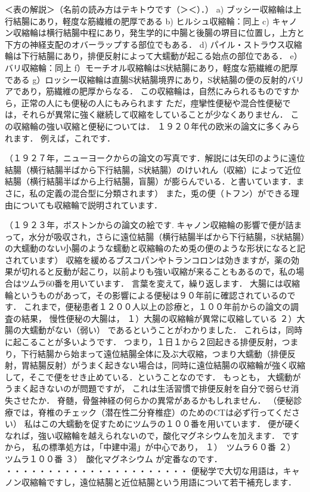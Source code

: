  
＜表の解説＞（名前の読み方はテキトウです（＞＜）．）
a) ブッシー収縮輪は上行結腸にあり，軽度な筋繊維の肥厚である
b) ヒルシュ収縮輪：同上
c) キャノン収縮輪は横行結腸中程にあり，発生学的に中腸と後腸の堺目に位置し，上方と下方の神経支配のオバーラップする部位でもある．
d) パイル・ストラウス収縮輪は下行結腸にあり，排便反射によって大蠕動が起こる始点の部位である．
e）バリ収縮輪：同上
f）モーチオル収縮輪はS状結腸にあり，軽度な筋繊維の肥厚である
g）ロッシー収縮輪は直腸S状結腸境界にあり，S状結腸の便の反射的バリアであり，筋繊維の肥厚からなる．
この収縮輪は，自然にみられるものですから，正常の人にも便秘の人にもみられます
ただ，痙攣性便秘や混合性便秘では，それらが異常に強く継続して収縮をしていることが少なくありません．
この収縮輪の強い収縮と便秘については．
１９２０年代の欧米の論文に多くみられます．
例えば，これです．

（１９２７年，ニューヨークからの論文の写真です．解説には矢印のように遠位結腸（横行結腸半ばから下行結腸，S状結腸）のけいれん（収縮）によって近位結腸（横行結腸半ばから上行結腸，盲腸）が膨らんでいる．と書いています．まさに，私の定義の混合型に分類されます）
また，兎の便（トフン）ができる理由についても収縮輪で説明されています．

（１９２３年，ボストンからの論文の絵です. キャノン収縮輪の影響で便が詰まって，水分が吸収され，さらに遠位結腸（横行結腸半ばから下行結腸，S状結腸）の大蠕動のない小腸のような蠕動と収縮輪のため兎の便のような形状になると記されています）
収縮を緩めるブスコパンやトランコロンは効きますが，薬の効果が切れると反動が起こり，以前よりも強い収縮が来ることもあるので，私の場合はツムラ60番を用いています．
言葉を変えて，繰り返します．
大腸には収縮輪というものがあって，その影響による便秘は９０年前に確認されているのです．
これまで，便秘患者１２００人以上の診療と，１００年前からの論文の調査の結果，
慢性便秘の大腸は，
１）大腸の収縮輪が異常に収縮している
２）大腸の大蠕動がない（弱い）
であるということがわかりました．
これらは，同時に起こることが多いようです．
つまり，１日１から２回起きる排便反射，つまり，下行結腸から始まって遠位結腸全体に及ぶ大収縮，つまり大蠕動（排便反射，胃結腸反射）がうまく起きない場合は，同時に遠位結腸の収縮輪が強く収縮して，そこで便をせき止めている．ということなのです．
もっとも，
大蠕動がうまく起きないのが問題ですが，
これは生活習慣で排便反射を自分で弱らせ消失させたか．
脊髄，骨盤神経の何らかの異常があるかもしれません．
（便秘診療では，脊椎のチェック（潜在性二分脊椎症）のためのCTは必ず行ってください）
私はこの大蠕動を促すためにツムラの１００番を用いています．
便が硬くなれば，強い収縮輪を越えられないので，酸化マグネシウムを加えます．
ですから，
私の標準処方は，「中建中湯」が中心であり，
１）　ツムラ６０番
２）　ツムラ１００番
３）　酸化マグネシウム
が定番なのです．
・・・・・・・・・・・・・・・・・・・・・・
便秘学で大切な用語は，キャノン収縮輪ですし，遠位結腸と近位結腸という用語について若干補充します．


